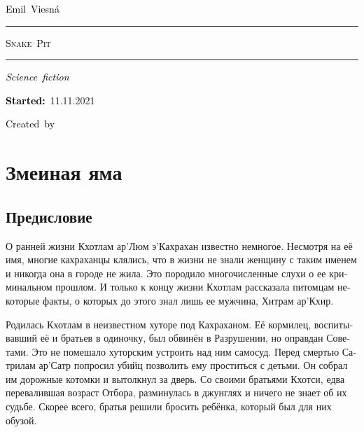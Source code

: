 \documentclass[a4paper,12pt,fleqn]{book}\usepackage{cooltooltips}\usepackage{polyglossia}\setdefaultlanguage{russian}\setotherlanguage{english}\defaultfontfeatures{Ligatures=TeX,Mapping=tex-text} \usepackage{xcolor}\definecolor{lightgray}{HTML}{bbbbbb}\color{lightgray}\newcommand{\ml}[3]{\textenglish{\textcolor{black}{#3}}}
\newcommand{\tofaauthor}{\ml{$0$}{Эмиль~Весна}{Emil~Viesn\'{a}}}
\newcommand{\tofatitle}{\ml{$0$}{ЗМЕИНАЯ~ЯМА}{Snake~Pit}}
\newcommand{\tofastarted}{11.11.2021}
\newcommand{\asterism}{\vspace{1em}{\centering\Large\bfseries$\ast~\ast~\ast$\par}\vspace{1em}}
\begin{document}

\begin{titlepage}
{\centering{~\par}\vspace{0.25\textheight}
{\LARGE\tofaauthor}\par
\vspace{1.0cm}\rule{17em}{1pt}\par\vspace{0.3cm}
{\Huge\textsc{\tofatitle}\par}
\vspace{0.3cm}\rule{17em}{2pt}\par\vspace{1.0cm}
{\Large\textit{\ml{$0$}{Фантастический~роман}{Science~fiction}}\par}
\vspace{0.5cm}\asterism\par\vspace{1.0cm}
{\textbf{\ml{$0$}{Начато:}{Started:}}~\tofastarted\par}\vfill
{\Large\ml{$0$}{Создано~в}{Created~by}~\XeLaTeX}\par}
\end{titlepage}

\tableofcontents

\part{Змеиная яма}

\chapter{Предисловие}

О ранней жизни Кхотлам ар'Люм э'Кахрахан известно немногое.
Несмотря на её имя, многие кахраханцы клялись, что в жизни не знали женщину с таким именем и никогда она в городе не жила.
Это породило многочисленные слухи о ее криминальном прошлом.
И только к концу жизни Кхотлам рассказала питомцам некоторые факты, о которых до этого знал лишь ее мужчина, Хитрам ар'Кхир.

Родилась Кхотлам в неизвестном хуторе под Кахраханом.
Её кормилец, воспитывавший её и братьев в одиночку, был обвинён в Разрушении, но оправдан Советами.
Это не помешало хуторским устроить над ним самосуд.
Перед смертью Сатрилам ар'Сатр попросил убийц позволить ему проститься с детьми.
Он собрал им дорожные котомки и вытолкнул за дверь.
Со своими братьями Кхотси, едва перевалившая возраст Отбора, разминулась в джунглях и ничего не знает об их судьбе.
Скорее всего, братья решили бросить ребёнка, который был для них обузой.
\end{document}
